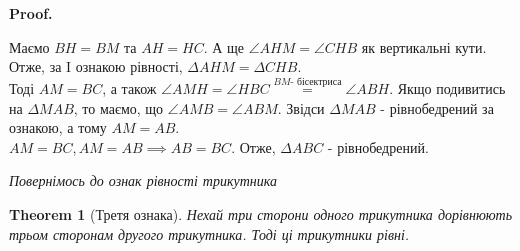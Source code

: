\documentclass[a4paper, 10pt]{article}
\makeatletter
\def\qed{$\blacksquare$}
\theoremstyle{theoremdd}
\newtheorem{theorem}{Theorem}[subsection]
\theoremstyle{theoremdd}
\theoremstyle{theoremdd}
\theoremstyle{theoremdd}
\theoremstyle{theoremdd}
\theoremstyle{theoremdd}
\theoremstyle{theoremdd}
\theoremstyle{theoremdd}
\theoremstyle{theoremdd}
\renewenvironment{proof}[1][Proof.\\]{\par
\pushQED{\hfill \qed}%
\normalfont \topsep6\p@\@plus6\p@\relax
\trivlist
\item\relax
{\bfseries
#1\@addpunct{.}}\hspace\labelsep\ignorespaces
}{%
\popQED\endtrivlist\@endpefalse
}
\makeatother
\begin{document}
\begin{proof}
\begin{figure}[H]
\end{figure}
Маємо $BH = BM$ та $AH = HC$. А ще $\angle AHM = \angle CHB$ як вертикальні кути. Отже, за I ознакою рівності, $\Delta AHM = \Delta CHB$.\\
Тоді $AM = BC$, а також $\angle AMH = \angle HBC \overset{BM \text{- бісектриса}}{=} \angle ABH$. Якщо подивитись на $\Delta MAB$, то маємо, що $\angle AMB = \angle ABM$. Звідси $\Delta MAB$ - рівнобедрений за ознакою, а тому $AM = AB$.\\
$AM = BC, AM = AB \implies AB = BC$. Отже, $\Delta ABC$ - рівнобедрений.
\end{proof}

\textit{Повернімось до ознак рівності трикутника}

\begin{theorem}[Третя ознака]
Нехай три сторони одного трикутника дорівнюють трьом сторонам другого трикутника. Тоді ці трикутники рівні.
\end{theorem}
\end{document}
